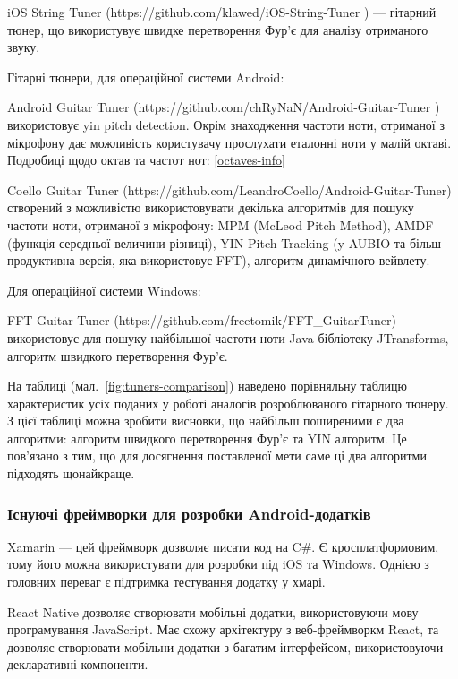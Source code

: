 iOS String Tuner (https://github.com/klawed/iOS-String-Tuner
) — гітарний тюнер, що використувує швидке перетворення Фур'є для аналізу отриманого звуку.

Гітарні тюнери, для операційної системи Android:

Android Guitar Tuner (https://github.com/chRyNaN/Android-Guitar-Tuner
) використовує yin pitch detection. Окрім знаходження частоти ноти, отриманої з мікрофону дає можливість користувачу прослухати еталонні ноти у малій октаві. Подробиці щодо октав та частот нот: \ref{octaves-info}

Coello Guitar Tuner (https://github.com/LeandroCoello/Android-Guitar-Tuner) створений з можливістю використовувати декілька алгоритмів для пошуку частоти ноти, отриманої з мікрофону: MPM (McLeod Pitch Method), AMDF (функція середньої величини різниці), YIN Pitch Tracking (y AUBIO та більш продуктивна версія, яка використовує FFT), алгоритм динамічного вейвлету.

Для операційної системи Windows: 

FFT Guitar Tuner (https://github.com/freetomik/FFT\_GuitarTuner) використовує для пошуку найбільшої частоти ноти Java-бібліотеку JTransforms, алгоритм швидкого перетворення Фур'є.


На таблиці (мал.~\ref{fig:tuners-comparison}) наведено порівняльну таблицю характеристик усіх поданих у роботі аналогів розроблюваного гітарного тюнеру. 
З цієї таблиці можна зробити висновки, що найбільш поширеними є два алгоритми: алгоритм швидкого перетворення Фур'є та YIN алгоритм. Це пов'язано з тим, що для досягнення поставленої мети саме ці два алгоритми підходять щонайкраще.

\subsubsection{Існуючі фреймворки для розробки Android-додатків}

Xamarin — цей фреймворк дозволяє писати код на C\#. Є кросплатформовим, тому його можна використувати для розробки під iOS та Windows. Однією з головних переваг є підтримка тестування додатку у хмарі. \cite{xamarin}

React Native дозволяє створювати мобільні додатки, використовуючи мову програмування JavaScript. Має схожу архітектуру з веб-фреймворкм React, та дозволяє створювати мобільни додатки з багатим інтерфейсом, використовуючи декларативні компоненти. \cite{react-native}

